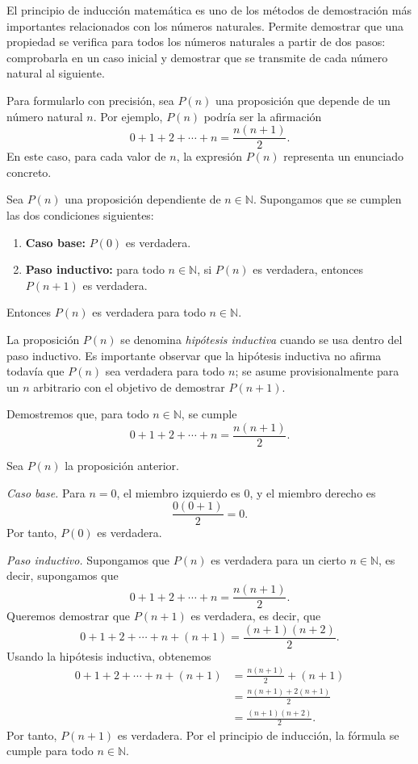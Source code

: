 El principio de inducción matemática es uno de los métodos de demostración más importantes relacionados con los números naturales. Permite demostrar que una propiedad se verifica para todos los números naturales a partir de dos pasos: comprobarla en un caso inicial y demostrar que se transmite de cada número natural al siguiente.

Para formularlo con precisión, sea \(P(n)\) una proposición que depende de un número natural \(n\). Por ejemplo, \(P(n)\) podría ser la afirmación
\[
  0+1+2+\cdots+n=\frac{n(n+1)}{2}.
\]
En este caso, para cada valor de \(n\), la expresión \(P(n)\) representa un enunciado concreto.

\begin{teorema}
Sea \(P(n)\) una proposición dependiente de \(n\in\mathbb{N}\). Supongamos que se cumplen las dos condiciones siguientes:
\begin{enumerate}
  \item \textbf{Caso base:} \(P(0)\) es verdadera.
  \item \textbf{Paso inductivo:} para todo \(n\in\mathbb{N}\), si \(P(n)\) es verdadera, entonces \(P(n+1)\) es verdadera.
\end{enumerate}
Entonces \(P(n)\) es verdadera para todo \(n\in\mathbb{N}\).
\end{teorema}

La proposición \(P(n)\) se denomina \emph{hipótesis inductiva} cuando se usa dentro del paso inductivo. Es importante observar que la hipótesis inductiva no afirma todavía que \(P(n)\) sea verdadera para todo \(n\); se asume provisionalmente para un \(n\) arbitrario con el objetivo de demostrar \(P(n+1)\).

\begin{ejemplo}
Demostremos que, para todo \(n\in\mathbb{N}\), se cumple
\[
  0+1+2+\cdots+n=\frac{n(n+1)}{2}.
\]

Sea \(P(n)\) la proposición anterior.

\emph{Caso base.} Para \(n=0\), el miembro izquierdo es \(0\), y el miembro derecho es
\[
  \frac{0(0+1)}{2}=0.
\]
Por tanto, \(P(0)\) es verdadera.

\emph{Paso inductivo.} Supongamos que \(P(n)\) es verdadera para un cierto \(n\in\mathbb{N}\), es decir, supongamos que
\[
  0+1+2+\cdots+n=\frac{n(n+1)}{2}.
\]
Queremos demostrar que \(P(n+1)\) es verdadera, es decir, que
\[
  0+1+2+\cdots+n+(n+1)=\frac{(n+1)(n+2)}{2}.
\]
Usando la hipótesis inductiva, obtenemos
\[
\begin{aligned}
  0+1+2+\cdots+n+(n+1)
  &= \frac{n(n+1)}{2}+(n+1) \\
  &= \frac{n(n+1)+2(n+1)}{2} \\
  &= \frac{(n+1)(n+2)}{2}.
\end{aligned}
\]
Por tanto, \(P(n+1)\) es verdadera. Por el principio de inducción, la fórmula se cumple para todo \(n\in\mathbb{N}\).
\end{ejemplo}

